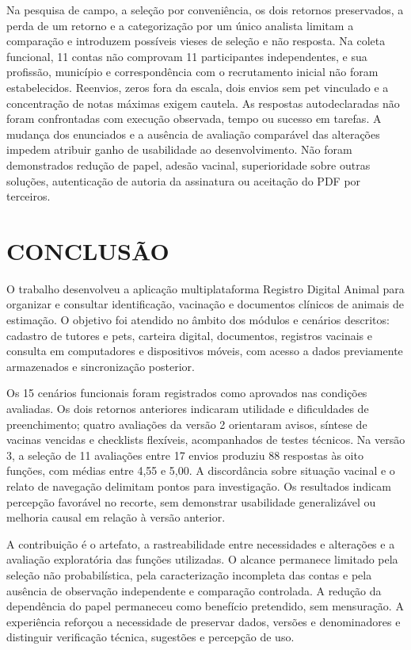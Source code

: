 \documentclass{UNESC}
\begin{document}
Na pesquisa de campo, a seleção por conveniência, os dois retornos preservados, a perda de um retorno e a categorização por um único analista limitam a comparação e introduzem possíveis vieses de seleção e não resposta. Na coleta funcional, 11 contas não comprovam 11 participantes independentes, e sua profissão, município e correspondência com o recrutamento inicial não foram estabelecidos. Reenvios, zeros fora da escala, dois envios sem pet vinculado e a concentração de notas máximas exigem cautela. As respostas autodeclaradas não foram confrontadas com execução observada, tempo ou sucesso em tarefas. A mudança dos enunciados e a ausência de avaliação comparável das alterações impedem atribuir ganho de usabilidade ao desenvolvimento. Não foram demonstrados redução de papel, adesão vacinal, superioridade sobre outras soluções, autenticação de autoria da assinatura ou aceitação do PDF por terceiros.

\section{CONCLUSÃO}

O trabalho desenvolveu a aplicação multiplataforma Registro Digital Animal para organizar e consultar identificação, vacinação e documentos clínicos de animais de estimação. O objetivo foi atendido no âmbito dos módulos e cenários descritos: cadastro de tutores e pets, carteira digital, documentos, registros vacinais e consulta em computadores e dispositivos móveis, com acesso a dados previamente armazenados e sincronização posterior.

Os 15 cenários funcionais foram registrados como aprovados nas condições avaliadas. Os dois retornos anteriores indicaram utilidade e dificuldades de preenchimento; quatro avaliações da versão 2 orientaram avisos, síntese de vacinas vencidas e checklists flexíveis, acompanhados de testes técnicos. Na versão 3, a seleção de 11 avaliações entre 17 envios produziu 88 respostas às oito funções, com médias entre 4,55 e 5,00. A discordância sobre situação vacinal e o relato de navegação delimitam pontos para investigação. Os resultados indicam percepção favorável no recorte, sem demonstrar usabilidade generalizável ou melhoria causal em relação à versão anterior.

A contribuição é o artefato, a rastreabilidade entre necessidades e alterações e a avaliação exploratória das funções utilizadas. O alcance permanece limitado pela seleção não probabilística, pela caracterização incompleta das contas e pela ausência de observação independente e comparação controlada. A redução da dependência do papel permaneceu como benefício pretendido, sem mensuração. A experiência reforçou a necessidade de preservar dados, versões e denominadores e distinguir verificação técnica, sugestões e percepção de uso.
\end{document}
